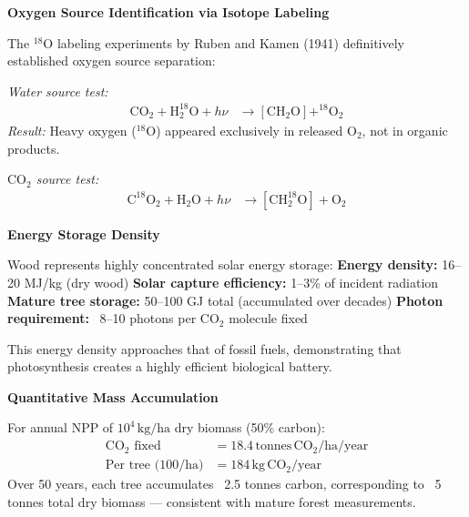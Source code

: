 \begin{technical}
\vspace{0.5em}
\noindent\textbf{Oxygen Source Identification via Isotope Labeling}

\vspace{0.2em}
\noindent The $^{18}\mathrm{O}$ labeling experiments by Ruben and Kamen (1941) definitively established oxygen source separation:\par

\noindent\textit{Water source test:}
\begin{align}
\mathrm{CO}_2 + \mathrm{H}_2^{18}\mathrm{O} + h\nu 
&\rightarrow [\mathrm{CH}_2\mathrm{O}] + ^{18}\mathrm{O}_2
\end{align}
\textit{Result:} Heavy oxygen ($^{18}\mathrm{O}$) appeared exclusively in released $\mathrm{O}_2$, not in organic products.\par
\noindent\textit{$\mathrm{CO}_2$ source test:}
\begin{align}
\mathrm{C}^{18}\mathrm{O}_2 + \mathrm{H}_2\mathrm{O} + h\nu 
&\rightarrow [\mathrm{CH}_2^{18}\mathrm{O}] + \mathrm{O}_2
\end{align}

\vspace{0.5em}
\noindent\textbf{Energy Storage Density}

\vspace{0.2em}
\noindent Wood represents highly concentrated solar energy storage: \noindent\textbf{Energy density:} 16–20 MJ/kg (dry wood) \noindent\textbf{Solar capture efficiency:} 1–3\% of incident radiation \noindent\textbf{Mature tree storage:} 50–100 GJ total (accumulated over decades) \noindent\textbf{Photon requirement:} ~8–10 photons per $\mathrm{CO}_2$ molecule fixed\par

\vspace{0.3em}
\noindent This energy density approaches that of fossil fuels, demonstrating that photosynthesis creates a highly efficient biological battery.

\vspace{0.5em}
\noindent\textbf{Quantitative Mass Accumulation}

\vspace{0.2em}
\noindent For annual NPP of $10^4\,\mathrm{kg/ha}$ dry biomass (50\% carbon):
\begin{align}
\text{$\mathrm{CO}_2$ fixed} &= 18.4\,\mathrm{tonnes}\,\mathrm{CO}_2/\mathrm{ha}/\mathrm{year} \\
\text{Per tree (100/ha)} &= 184\,\mathrm{kg}\,\mathrm{CO}_2/\mathrm{year}
\end{align}
Over 50 years, each tree accumulates ~2.5 tonnes carbon, corresponding to ~5 tonnes total dry biomass — consistent with mature forest measurements.\par


\end{technical}
